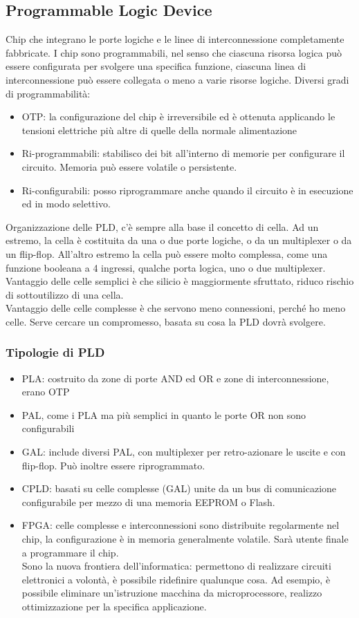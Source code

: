 \documentclass{article}
\begin{document}
\subsection{Programmable Logic Device}
Chip che integrano le porte logiche e le linee di interconnessione completamente fabbricate. I chip sono programmabili, nel senso che ciascuna risorsa logica può essere configurata per svolgere una specifica funzione, ciascuna linea di interconnessione può essere collegata o meno a varie risorse logiche. Diversi gradi di programmabilità:
\begin{itemize}
\item OTP: la configurazione del chip è irreversibile ed è ottenuta applicando le tensioni elettriche più altre di quelle della normale alimentazione
\item Ri-programmabili: stabilisco dei bit all'interno di memorie per configurare il circuito. Memoria può essere volatile o persistente.
\item Ri-configurabili: posso riprogrammare anche quando il circuito è in esecuzione ed in modo selettivo.
\end{itemize}
Organizzazione delle PLD, c'è sempre alla base il  concetto di cella. Ad un estremo, la cella è costituita da una o due porte logiche, o da un multiplexer o da un flip-flop. All'altro estremo la cella può essere molto complessa, come una funzione booleana a 4 ingressi, qualche porta logica, uno o due multiplexer.\\ Vantaggio delle celle semplici è che silicio è maggiormente sfruttato, riduco rischio di sottoutilizzo di una cella.\\ Vantaggio delle celle complesse è che servono meno connessioni, perché ho meno celle. Serve cercare un compromesso, basata su cosa la PLD dovrà svolgere.
\subsubsection{Tipologie di PLD}
\begin{itemize}
\item PLA: costruito da zone di porte AND ed OR e zone di interconnessione, erano OTP
\item PAL, come i PLA ma più semplici in quanto le porte OR non sono configurabili
\item GAL: include diversi PAL, con multiplexer per retro-azionare le uscite e con flip-flop. Può inoltre essere riprogrammato.
\item CPLD: basati su celle complesse (GAL) unite da un bus di comunicazione configurabile per mezzo di una memoria EEPROM o Flash.
\item FPGA: celle complesse e interconnessioni sono distribuite regolarmente nel chip, la configurazione è in memoria generalmente volatile. Sarà utente finale a programmare il chip.\\ Sono la nuova frontiera dell'informatica: permettono di realizzare circuiti elettronici a volontà, è possibile ridefinire qualunque cosa. Ad esempio, è possibile eliminare un'istruzione macchina da microprocessore, realizzo ottimizzazione per la specifica applicazione.
\end{itemize}
\end{document}
